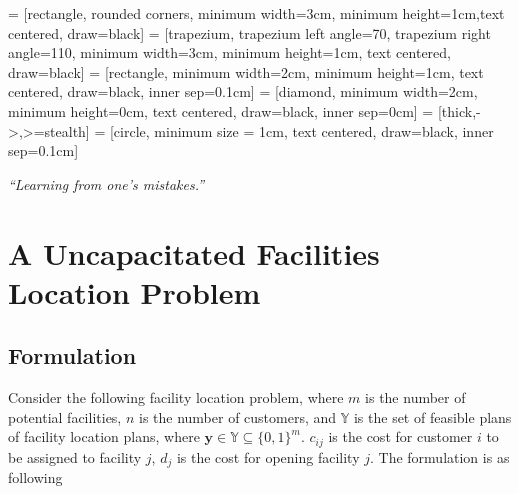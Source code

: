 
\usepackage{makecell}

\usetikzlibrary{shapes.geometric, arrows}
     = [rectangle, rounded corners, minimum width=3cm, minimum height=1cm,text centered, draw=black]
     = [trapezium, trapezium left angle=70, trapezium right angle=110, minimum width=3cm, minimum height=1cm, text centered, draw=black]
     = [rectangle, minimum width=2cm, minimum height=1cm, text centered, draw=black, inner sep=0.1cm]
     = [diamond, minimum width=2cm, minimum height=0cm, text centered, draw=black, inner sep=0cm]
     = [thick,->,>=stealth]
     = [circle, minimum size = 1cm, text centered, draw=black, inner sep=0.1cm]

\renewcommand{\docTitle}{Lecture 8 - Benders Decomposition}
\renewcommand{\docAuthor}{Lan Peng, Ph.D.}
\renewcommand{\docAffil}{School of Management, Shanghai University, Shanghai, China}

    \titleSec

    \begin{center}
        \textit{``Learning from one's mistakes.''}
    \end{center}

    \section{A Uncapacitated Facilities Location Problem}
        \subsection{Formulation}
            Consider the following facility location problem, where $m$ is the number of potential facilities, $n$ is the number of customers, and $\mathbb{Y}$ is the set of feasible plans of facility location plans, where $\mathbf{y} \in \mathbb{Y} \subseteq \{0, 1\}^m$. $c_{ij}$ is the cost for customer $i$ to be assigned to facility $j$, $d_j$ is the cost for opening facility $j$. The formulation is as following
            
